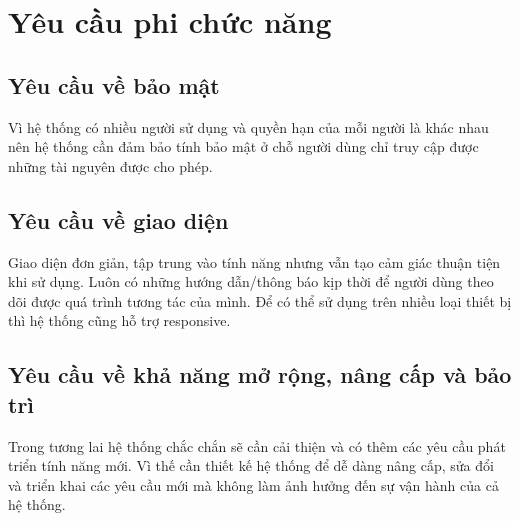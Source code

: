 \documentclass[../DoAn.tex]{subfiles}
\begin{document}
\section{Yêu cầu phi chức năng}
\label{section:2.4}
\subsection{Yêu cầu về bảo mật}
Vì hệ thống có nhiều người sử dụng và quyền hạn của mỗi người là khác nhau nên hệ thống cần đảm bảo tính bảo mật ở chỗ người dùng chỉ truy cập được những tài nguyên được cho phép.

\subsection{Yêu cầu về giao diện}
Giao diện đơn giản, tập trung vào tính năng nhưng vẫn tạo cảm giác thuận tiện khi sử dụng. Luôn có những hướng dẫn/thông báo kịp thời để người dùng theo dõi được quá trình tương tác của mình. Để có thể sử dụng trên nhiều loại thiết bị thì hệ thống cũng hỗ trợ responsive.

\subsection{Yêu cầu về khả năng mở rộng, nâng cấp và bảo trì}
Trong tương lai hệ thống chắc chắn sẽ cần cải thiện và có thêm các yêu cầu phát triển tính năng mới. Vì thế cần thiết kế hệ thống để dễ dàng nâng cấp, sửa đổi và triển khai các yêu cầu mới mà không làm ảnh hưởng đến sự vận hành của cả hệ thống. 
\end{document}
